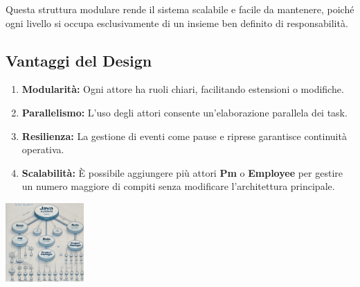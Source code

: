 Questa struttura modulare rende il sistema scalabile e facile da mantenere, poiché ogni livello si occupa esclusivamente di un insieme ben definito di responsabilità.

\subsection*{Vantaggi del Design}
\begin{enumerate}
    \item \textbf{Modularità:} Ogni attore ha ruoli chiari, facilitando estensioni o modifiche.
    \item \textbf{Parallelismo:} L'uso degli attori consente un'elaborazione parallela dei task.
    \item \textbf{Resilienza:} La gestione di eventi come pause e riprese garantisce continuità operativa.
    \item \textbf{Scalabilità:} È possibile aggiungere più attori \textbf{Pm} o \textbf{Employee} per gestire un numero maggiore di compiti senza modificare l'architettura principale.
\end{enumerate}


\includegraphics[width=3cm]{report/img/chaGpt-graph.png}\\[0.5cm]